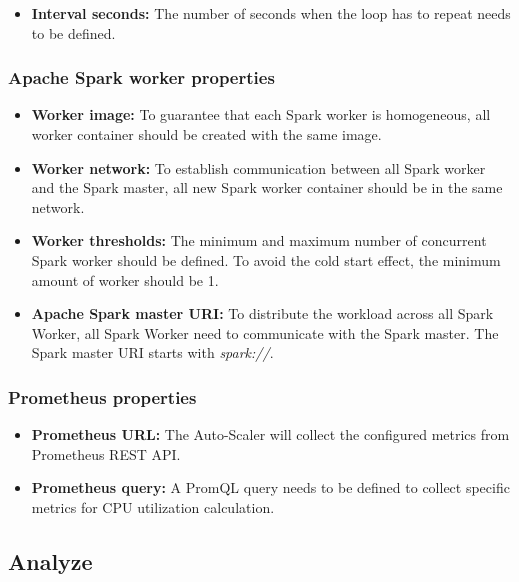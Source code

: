 \begin{itemize}
\item \textbf{Interval seconds:} The number of seconds when the loop has to repeat needs to be defined.
\end{itemize}

\subsubsection{Apache Spark worker properties}

\begin{itemize}
\item \textbf{Worker image:} To guarantee that each Spark worker is homogeneous, all worker container should be created with the same image.

\item \textbf{Worker network:} To establish communication between all Spark worker and the Spark master, all new Spark worker container should be in the same network.

\item \textbf{Worker thresholds:} The minimum and maximum number of concurrent Spark worker should be defined. To avoid the cold start effect, the minimum amount of worker should be 1. 

\item \textbf{Apache Spark master URI:} To distribute the workload across all Spark Worker, all Spark Worker need to communicate with the Spark master. The Spark master URI starts with \textit{spark://}.
\end{itemize}

\subsubsection{Prometheus properties}

\begin{itemize}
\item \textbf{Prometheus URL:} The Auto-Scaler will collect the configured metrics from Prometheus REST API.

\item \textbf{Prometheus query:} A PromQL query needs to be defined to collect specific metrics for CPU utilization calculation. 
\end{itemize}


\subsection{Analyze}

